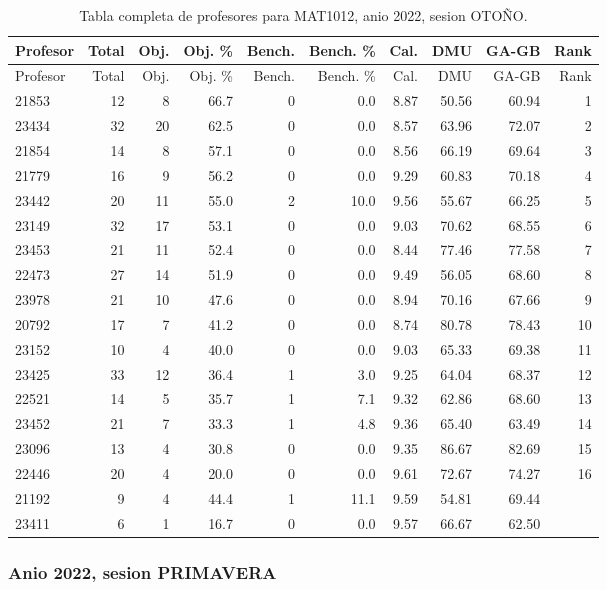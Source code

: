\begingroup
\scriptsize
\setlength{\tabcolsep}{3pt}
\begin{longtable}{lrrrrrrrrr}
\caption{Tabla completa de profesores para MAT1012, anio 2022, sesion OTOÑO.}\label{tab:prof-period-mat1012-2022-oto-o}\\
\toprule
Profesor & Total & Obj. & Obj. \% & Bench. & Bench. \% & Cal. & DMU & GA-GB & Rank \\
\midrule
\endfirsthead
\toprule
Profesor & Total & Obj. & Obj. \% & Bench. & Bench. \% & Cal. & DMU & GA-GB & Rank \\
\midrule
\endhead
21853 & 12 & 8 & 66.7 & 0 & 0.0 & 8.87 & 50.56 & 60.94 & 1 \\
23434 & 32 & 20 & 62.5 & 0 & 0.0 & 8.57 & 63.96 & 72.07 & 2 \\
21854 & 14 & 8 & 57.1 & 0 & 0.0 & 8.56 & 66.19 & 69.64 & 3 \\
21779 & 16 & 9 & 56.2 & 0 & 0.0 & 9.29 & 60.83 & 70.18 & 4 \\
23442 & 20 & 11 & 55.0 & 2 & 10.0 & 9.56 & 55.67 & 66.25 & 5 \\
23149 & 32 & 17 & 53.1 & 0 & 0.0 & 9.03 & 70.62 & 68.55 & 6 \\
23453 & 21 & 11 & 52.4 & 0 & 0.0 & 8.44 & 77.46 & 77.58 & 7 \\
22473 & 27 & 14 & 51.9 & 0 & 0.0 & 9.49 & 56.05 & 68.60 & 8 \\
23978 & 21 & 10 & 47.6 & 0 & 0.0 & 8.94 & 70.16 & 67.66 & 9 \\
20792 & 17 & 7 & 41.2 & 0 & 0.0 & 8.74 & 80.78 & 78.43 & 10 \\
23152 & 10 & 4 & 40.0 & 0 & 0.0 & 9.03 & 65.33 & 69.38 & 11 \\
23425 & 33 & 12 & 36.4 & 1 & 3.0 & 9.25 & 64.04 & 68.37 & 12 \\
22521 & 14 & 5 & 35.7 & 1 & 7.1 & 9.32 & 62.86 & 68.60 & 13 \\
23452 & 21 & 7 & 33.3 & 1 & 4.8 & 9.36 & 65.40 & 63.49 & 14 \\
23096 & 13 & 4 & 30.8 & 0 & 0.0 & 9.35 & 86.67 & 82.69 & 15 \\
22446 & 20 & 4 & 20.0 & 0 & 0.0 & 9.61 & 72.67 & 74.27 & 16 \\
21192 & 9 & 4 & 44.4 & 1 & 11.1 & 9.59 & 54.81 & 69.44 &  \\
23411 & 6 & 1 & 16.7 & 0 & 0.0 & 9.57 & 66.67 & 62.50 &  \\
\bottomrule
\end{longtable}
\endgroup

\subsubsection{Anio 2022, sesion PRIMAVERA}

